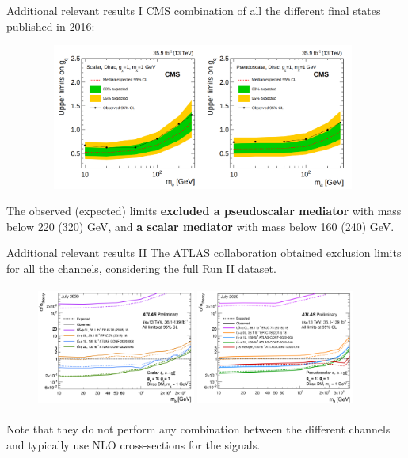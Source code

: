 \documentclass[8pt]{beamer}
\begin{document}
\begin{frame}{Additional relevant results I}
\justifying
CMS combination of all the different final states published in 2016:

\begin{figure}[htbp]
\begin{center}
\includegraphics[width=11cm, height=4.8cm]{figs/CMSttbarExclusion.png}
\end{center}
\end{figure} \vfill

The observed (expected) limits \textbf{excluded a pseudoscalar mediator} with mass below 220 (320) GeV, and \textbf{a scalar mediator} with mass below 160 (240) GeV. \vfill
\end{frame}

\begin{frame}{Additional relevant results II}
\justifying
The ATLAS collaboration obtained \alert{exclusion limits for all the channels}, considering the full Run II dataset. \vfill

\begin{figure}[htbp]
\centering
\begin{minipage}[b]{.5\textwidth}
\includegraphics[width=5.2cm, height=4cm]{figs/ATLASttDM_scalar.png}
\end{minipage}\hfill
\begin{minipage}[b]{.5\textwidth}
\includegraphics[width=5.2cm, height=4cm]{figs/ATLASttDM_pseudoscalar.png}
\end{minipage}\hfill
\end{figure} \vfill

Note that they do not perform any combination between the different channels and typically use NLO cross-sections for the signals. \vfill
\end{frame}
\end{document}
